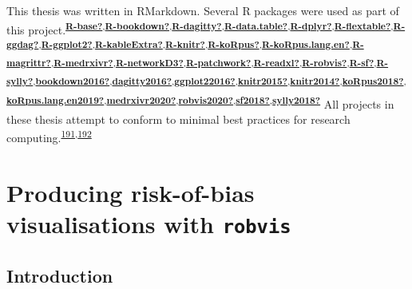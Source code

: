 \documentclass[a4paper, twoside]{templates/ociamthesis}
\begin{document}
This thesis was written in RMarkdown. Several R packages were used as part of this project.\textsuperscript{\protect\hyperlink{ref-R-base}{\textbf{R-base?}},\protect\hyperlink{ref-R-bookdown}{\textbf{R-bookdown?}},\protect\hyperlink{ref-R-dagitty}{\textbf{R-dagitty?}},\protect\hyperlink{ref-R-data.table}{\textbf{R-data.table?}},\protect\hyperlink{ref-R-dplyr}{\textbf{R-dplyr?}},\protect\hyperlink{ref-R-flextable}{\textbf{R-flextable?}},\protect\hyperlink{ref-R-ggdag}{\textbf{R-ggdag?}},\protect\hyperlink{ref-R-ggplot2}{\textbf{R-ggplot2?}},\protect\hyperlink{ref-R-kableExtra}{\textbf{R-kableExtra?}},\protect\hyperlink{ref-R-knitr}{\textbf{R-knitr?}},\protect\hyperlink{ref-R-koRpus}{\textbf{R-koRpus?}},\protect\hyperlink{ref-R-koRpus.lang.en}{\textbf{R-koRpus.lang.en?}},\protect\hyperlink{ref-R-magrittr}{\textbf{R-magrittr?}},\protect\hyperlink{ref-R-medrxivr}{\textbf{R-medrxivr?}},\protect\hyperlink{ref-R-networkD3}{\textbf{R-networkD3?}},\protect\hyperlink{ref-R-patchwork}{\textbf{R-patchwork?}},\protect\hyperlink{ref-R-readxl}{\textbf{R-readxl?}},\protect\hyperlink{ref-R-robvis}{\textbf{R-robvis?}},\protect\hyperlink{ref-R-sf}{\textbf{R-sf?}},\protect\hyperlink{ref-R-sylly}{\textbf{R-sylly?}},\protect\hyperlink{ref-bookdown2016}{\textbf{bookdown2016?}},\protect\hyperlink{ref-dagitty2016}{\textbf{dagitty2016?}},\protect\hyperlink{ref-ggplot22016}{\textbf{ggplot22016?}},\protect\hyperlink{ref-knitr2015}{\textbf{knitr2015?}},\protect\hyperlink{ref-knitr2014}{\textbf{knitr2014?}},\protect\hyperlink{ref-koRpus2018}{\textbf{koRpus2018?}},\protect\hyperlink{ref-koRpus.lang.en2019}{\textbf{koRpus.lang.en2019?}},\protect\hyperlink{ref-medrxivr2020}{\textbf{medrxivr2020?}},\protect\hyperlink{ref-robvis2020}{\textbf{robvis2020?}},\protect\hyperlink{ref-sf2018}{\textbf{sf2018?}},\protect\hyperlink{ref-sylly2018}{\textbf{sylly2018?}}}
All projects in these thesis attempt to conform to minimal best practices for research computing.\textsuperscript{\protect\hyperlink{ref-wilson2014}{191},\protect\hyperlink{ref-wilson2017}{192}}

\hypertarget{appendix-robvis}{%
\section{\texorpdfstring{Producing risk-of-bias visualisations with \texttt{robvis}}{Producing risk-of-bias visualisations with robvis}}\label{appendix-robvis}}

\hypertarget{introduction-3}{%
\subsection{Introduction}\label{introduction-3}}
\end{document}
